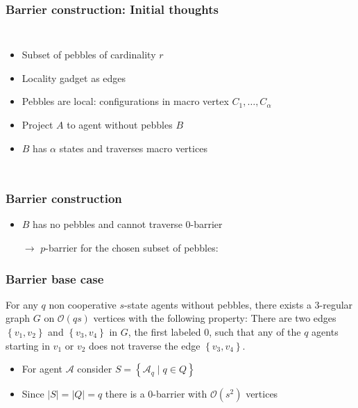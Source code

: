 \documentclass{beamer}
\begin{document}
\begin{frame}
  \frametitle{Barrier construction: Initial thoughts}
  \begin{columns}
    \begin{itemize}
      \item Subset of pebbles of cardinality $r$
      \item Locality gadget as edges
      \item Pebbles are local: configurations in macro vertex
        $C_{1},\dots,C_{\alpha}$
      \item Project $A$ to agent without pebbles $B$
      \item $B$ has $\alpha$ states and traverses macro vertices
    \end{itemize}
    \resizebox{\textwidth}{!}{}
  \end{columns}
\end{frame}

\begin{frame}
  \frametitle{Barrier construction}
  \begin{itemize}
    \item $B$ has no pebbles and cannot traverse $0$-barrier
    \item[$\rightarrow$] $p$-barrier for the chosen subset of pebbles:
  \end{itemize}
  \begin{center}
    \resizebox{0.8\textwidth}{!}{}
  \end{center}
\end{frame}

\begin{frame}
  \frametitle{Barrier base case}
  \begin{theorem}[Fraigniaud et al.]
    For any $q$ non cooperative $s$-state agents without pebbles, there
    exists a 3-regular graph $G$ on $\mathcal{O}(qs)$ vertices with the
    following property: There are two edges $\left\{v_{1},v_{2}\right\}$
    and $\left\{v_{3},v_{4}\right\}$ in $G$, the first labeled 0, such
    that any of the $q$ agents starting in $v_{1}$ or $v_{2}$ does not
    traverse the edge $\left\{v_{3},v_{4}\right\}$.
  \end{theorem}
  \begin{itemize}
    \item For agent $\mathcal{A}$ consider
      $S = \left\{\mathcal{A}_{q}\mid q\in Q\right\}$
    \item Since $|S| = |Q| = q$ there is a 0-barrier with $\mathcal{O}(s^{2})$
      vertices
  \end{itemize}
\end{frame}
\end{document}
